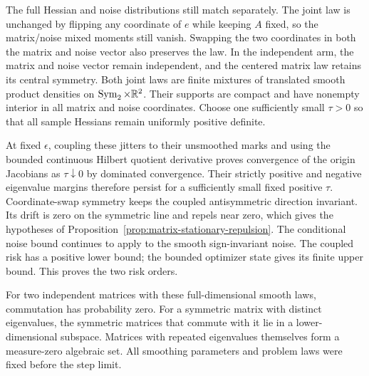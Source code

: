 The full Hessian and noise distributions still match separately. The
joint law is unchanged by flipping any coordinate of $e$ while keeping
$A$ fixed, so the matrix/noise mixed moments still vanish. Swapping the two
coordinates in both the matrix and noise vector also preserves the law. In the independent arm, the matrix
and noise vector remain independent, and the centered matrix law
retains its central symmetry. Both joint laws are finite mixtures
of translated smooth product densities on
$\operatorname{Sym}_2\times\mathbb R^2$. Their supports are compact and have nonempty interior in all matrix
and noise coordinates. Choose one sufficiently small $\tau>0$ so that all sample
Hessians remain uniformly positive definite.

At fixed $\epsilon$, coupling these jitters to their unsmoothed marks and
using the bounded continuous Hilbert quotient derivative proves convergence
of the origin Jacobians as $\tau\downarrow0$ by dominated convergence.
Their strictly positive and negative eigenvalue margins therefore
persist for a sufficiently small fixed positive $\tau$. Coordinate-swap symmetry keeps the coupled antisymmetric direction
invariant. Its drift is zero on the symmetric line and repels near zero,
which gives the hypotheses of
Proposition~\ref{prop:matrix-stationary-repulsion}. The conditional noise bound continues to apply to the smooth
sign-invariant noise. The coupled risk has a positive lower bound; the
bounded optimizer state gives its finite upper bound. This proves the two risk orders.

For two independent matrices with these full-dimensional smooth laws,
commutation has probability zero. For a symmetric matrix with distinct
eigenvalues, the symmetric matrices that commute with it lie in a
lower-dimensional subspace. Matrices with repeated eigenvalues themselves
form a measure-zero algebraic set. All smoothing
parameters and problem laws were fixed before the step limit.

